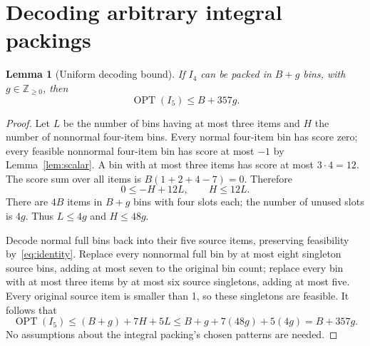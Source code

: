 \documentclass[11pt,a4paper]{article}
\newtheorem{lemma}[theorem]{Lemma}
\newcommand{\OPT}{\operatorname{OPT}}
\begin{document}
\section{Decoding arbitrary integral packings}
\begin{lemma}[Uniform decoding bound]\label{lem:decode}
If $I_4$ can be packed in $B+g$ bins, with $g\in\mathbb Z_{\ge0}$, then
\begin{equation}\label{eq:decode}
\OPT(I_5)\le B+357g.
\end{equation}
\end{lemma}
\begin{proof}
Let $L$ be the number of bins having at most three items and $H$ the number of nonnormal four-item bins. Every normal four-item bin has score zero; every feasible nonnormal four-item bin has score at most $-1$ by Lemma~\ref{lem:scalar}. A bin with at most three items has score at most $3\cdot4=12$. The score sum over all items is $B(1+2+4-7)=0$. Therefore
\[
0\le -H+12L,\qquad H\le12L.
\]
There are $4B$ items in $B+g$ bins with four slots each; the number of unused slots is $4g$. Thus $L\le4g$ and $H\le48g$.

Decode normal full bins back into their five source items, preserving feasibility by~\eqref{eq:identity}. Replace every nonnormal full bin by at most eight singleton source bins, adding at most seven to the original bin count; replace every bin with at most three items by at most six source singletons, adding at most five. Every original source item is smaller than 1, so these singletons are feasible. It follows that
\[
\OPT(I_5)\le (B+g)+7H+5L
\le B+g+7(48g)+5(4g)=B+357g.
\]
No assumptions about the integral packing's chosen patterns are needed.
\end{proof}
\end{document}
